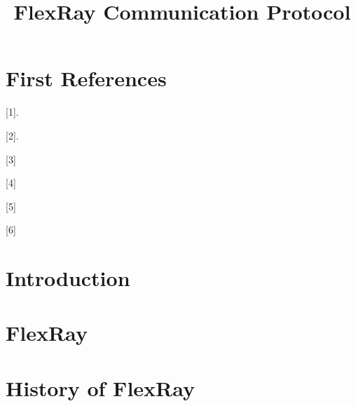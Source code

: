 \documentclass[conference]{IEEEtran}
\begin{document}
\title{FlexRay Communication Protocol\\
}

\author{
\and
{}

}

\maketitle

\begin{abstract}

\end{abstract}

\begin{IEEEkeywords}

\end{IEEEkeywords}

\section{First References}
[1]\cite{enosh2014efficient}.

[2]\cite{kopetz2001comparison}.

[3]\cite{makowitz2006flexray}

[4]\cite{shaw2008introduction}

[5]\cite{rausch2007flexray}

[6]\cite{xu2008implementation}

\section{Introduction}


\section{FlexRay}

\section{History of FlexRay}
\end{document}
